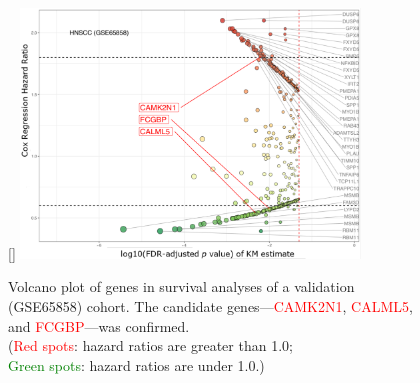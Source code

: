 \documentclass[
paper=landscape,
paper=160mm:90mm, %
fontsize=11pt, %
pagesize, %
parskip=half-, %
]{scrartcl} %
\theoremstyle{mythmstyle} %
\begin{document}
%
\clearpage

\thispagestyle{headings}

\begin{figure}[ht]
[\FBwidth]
{    \includegraphics[width=9cm]{Rplot_GSE65858_CoxHR_CAMK2N1_top3FDRKM.pdf}}
{\captionsetup{labelformat=empty}    \caption{Volcano plot of genes in survival analyses of a validation (GSE65858) cohort.
The candidate genes---\textcolor{red}{CAMK2N1}, \textcolor{red}{CALML5}, and \textcolor{red}{FCGBP}---was confirmed.\\
    (\textcolor{red}{Red spots}: hazard ratios are greater than 1.0;\\
    \textcolor{green}{Green spots}: hazard ratios are under 1.0.)
    }}
\end{figure}


\clearpage
\end{document}

